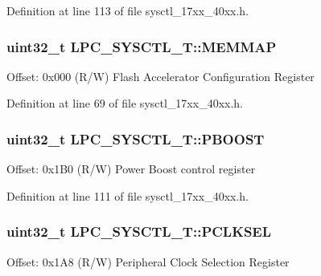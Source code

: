 Definition at line 113 of file sysctl\+\_\+17xx\+\_\+40xx.\+h.

\subsubsection[{\texorpdfstring{M\+E\+M\+M\+AP}{MEMMAP}}]{ uint32\+\_\+t L\+P\+C\+\_\+\+S\+Y\+S\+C\+T\+L\+\_\+\+T\+::\+M\+E\+M\+M\+AP}\hypertarget{structLPC__SYSCTL__T_a5a5d2dc160a256a110878af0c2757a64}{}\label{structLPC__SYSCTL__T_a5a5d2dc160a256a110878af0c2757a64}
Offset\+: 0x000 (R/W) Flash Accelerator Configuration Register 

Definition at line 69 of file sysctl\+\_\+17xx\+\_\+40xx.\+h.

\subsubsection[{\texorpdfstring{P\+B\+O\+O\+ST}{PBOOST}}]{ uint32\+\_\+t L\+P\+C\+\_\+\+S\+Y\+S\+C\+T\+L\+\_\+\+T\+::\+P\+B\+O\+O\+ST}\hypertarget{structLPC__SYSCTL__T_acc912b84bbe8dc170fdf50300d341acb}{}\label{structLPC__SYSCTL__T_acc912b84bbe8dc170fdf50300d341acb}
Offset\+: 0x1\+B0 (R/W) Power Boost control register 

Definition at line 111 of file sysctl\+\_\+17xx\+\_\+40xx.\+h.

\subsubsection[{\texorpdfstring{P\+C\+L\+K\+S\+EL}{PCLKSEL}}]{ uint32\+\_\+t L\+P\+C\+\_\+\+S\+Y\+S\+C\+T\+L\+\_\+\+T\+::\+P\+C\+L\+K\+S\+EL}\hypertarget{structLPC__SYSCTL__T_a55111e26d098f9e4ee0dbfd5b243a014}{}\label{structLPC__SYSCTL__T_a55111e26d098f9e4ee0dbfd5b243a014}
Offset\+: 0x1\+A8 (R/W) Peripheral Clock Selection Register 

